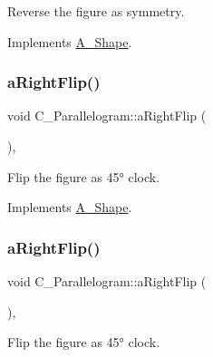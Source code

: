 Reverse the figure as symmetry. 



Implements \hyperlink{classA__Shape_afe2c7969d647f6358da13879a7534ecb}{A\+\_\+\+Shape}.

\mbox{\label{classC__Parallelogram_ab638d55c999ea10da7b5000fd034fbc1}} 
\subsubsection{\texorpdfstring{a\+Right\+Flip()}{aRightFlip()}\hspace{0.1cm}{\footnotesize\ttfamily [1/2]}}
{\footnotesize\ttfamily void C\+\_\+\+Parallelogram\+::a\+Right\+Flip (\begin{DoxyParamCaption}{ }\end{DoxyParamCaption})\hspace{0.3cm}{\ttfamily [override]}, {\ttfamily [virtual]}}



Flip the figure as 45° clock. 



Implements \hyperlink{classA__Shape_a892688cbbad3297e00e87cce0dbfc76d}{A\+\_\+\+Shape}.

\mbox{\label{classC__Parallelogram_ab638d55c999ea10da7b5000fd034fbc1}} 
\subsubsection{\texorpdfstring{a\+Right\+Flip()}{aRightFlip()}\hspace{0.1cm}{\footnotesize\ttfamily [2/2]}}
{\footnotesize\ttfamily void C\+\_\+\+Parallelogram\+::a\+Right\+Flip (\begin{DoxyParamCaption}{ }\end{DoxyParamCaption})\hspace{0.3cm}{\ttfamily [override]}, {\ttfamily [virtual]}}



Flip the figure as 45° clock. 



